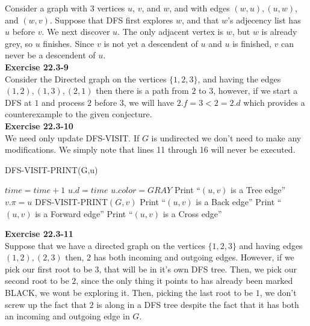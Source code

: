\documentclass{article}
\begin{document}
Consider a graph with 3 vertices $u$, $v$, and $w$, and with edges $(w,u), (u,w)$, and $(w,v)$.  Suppose that DFS first explores $w$, and that $w$'s adjecency list has $u$ before $v$.  We next discover $u$.  The only adjacent vertex is $w$, but $w$ is already grey, so $u$ finishes. Since $v$ is not yet a descendent of $u$ and $u$ is finished, $v$ can never be a descendent of $u$. \\

\noindent\textbf{Exercise 22.3-9}\\

Consider the Directed graph on the vertices $\{1,2,3\}$, and having the edges $(1,2),(1,3),(2,1)$ then there is a path from $2$ to $3$, however, if we start a DFS at $1$ and process $2$ before $3$, we will have $2.f = 3 < 2 = 2.d$ which provides a counterexample to the given conjecture.\\

\noindent\textbf{Exercise 22.3-10}\\

We need only update DFS-VISIT.  If $G$ is undirected we don't need to make any modifications.  We simply note that lines 11 through 16 will never be executed. \\
\begin{algorithm}
\caption{DFS-VISIT-PRINT(G,u)}
\begin{algorithmic}[1]
\State $time = time + 1$
\State $u.d = time$
\State $u.color = GRAY$
		\State Print ``$(u,v)$ is a Tree edge''
		\State $v.\pi = u$
		\State DFS-VISIT-PRINT$(G,v)$
		\State Print ``$(u,v)$ is a Back edge''
	\Else
			\State Print ``$(u,v)$ is a Forward edge''
		\Else
			\State Print ``$(u,v)$ is a Cross edge''
		\EndIf
	\EndIf
\EndFor 
\end{algorithmic}
\end{algorithm}

\noindent\textbf{Exercise 22.3-11}\\

Suppose that we have a directed graph on the vertices $\{1,2,3\}$ and having edges $(1,2),(2,3)$ then, 2 has both incoming and outgoing edges. However, if we pick our first root to be $3$, that will be in it's own DFS tree. Then, we pick our second root to be $2$, since the only thing it points to has already been marked BLACK, we wont be exploring it. Then, picking the last root to be $1$, we don't screw up the fact that $2$ is along in a DFS tree despite the fact that it has both an incoming and outgoing edge in $G$.\\
\end{document}
